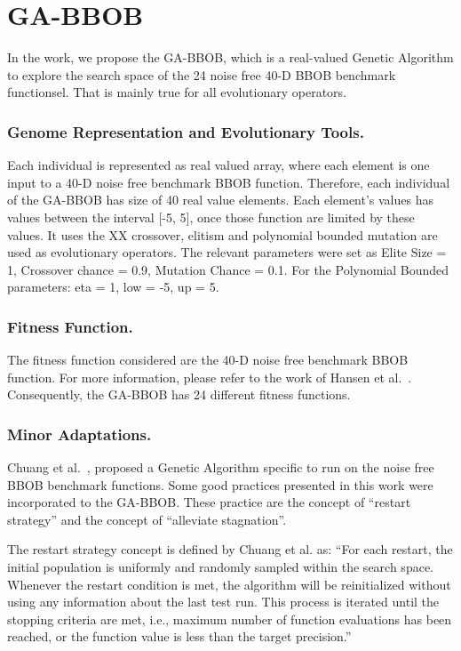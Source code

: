 \section{GA-BBOB}\label{sec:proposed:ga-bbob}

In the work, we propose the GA-BBOB, which is a real-valued Genetic Algorithm to explore the search space of the 24 noise free 40-D BBOB benchmark functionsel. That is mainly true for all evolutionary operators. 

\subsubsection*{Genome Representation and Evolutionary Tools.}
Each individual is represented as real valued array, where each element is one input to a 40-D noise free benchmark BBOB function. Therefore, each individual of the GA-BBOB has size of 40 real value elements. Each element's values has values between the interval [-5, 5], once those function are limited by these values. It uses the XX crossover, elitism and polynomial bounded mutation are used as evolutionary operators. The relevant parameters were set as Elite Size = 1, Crossover chance = 0.9, Mutation Chance = 0.1. For the Polynomial Bounded parameters: eta = 1, low = -5, up = 5.


\subsubsection*{Fitness Function.}
The fitness function considered are the 40-D noise free benchmark BBOB function. For more information, please refer to the work of Hansen et al.~\cite{hansen2010real}.
Consequently, the GA-BBOB has 24 different fitness functions. 


\subsubsection*{Minor Adaptations.}
Chuang et al.~\cite{chuang2012black}, proposed a Genetic Algorithm specific to run on the noise free BBOB benchmark functions. Some good practices presented in this work were incorporated to the GA-BBOB. These practice are the concept of ``restart strategy'' and the concept of ``alleviate stagnation''.

The restart strategy concept is defined by Chuang et al. as: ``For each restart, the initial population  is uniformly and randomly sampled within the search space. Whenever the restart condition is met, the algorithm will be reinitialized without using any information about the last test run. This process is iterated until the stopping criteria are met, i.e., maximum number of function evaluations has been reached, or the function value is less than the target precision.''


